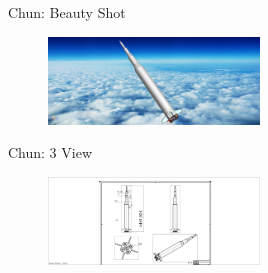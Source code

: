 \documentclass[10pt]{beamer}
\begin{document}
	\begin{frame}{Chun: Beauty Shot}
\begin{figure}
	\centering
	\includegraphics[width=0.5\textwidth]{Chun_Beauty.png}
\end{figure}
\end{frame}

\begin{frame}{Chun: 3 View}
\begin{figure}
\centering
\includegraphics[width=0.5\textwidth]{Chun_3_View.png}
\end{figure}
\end{frame}
\end{document}

